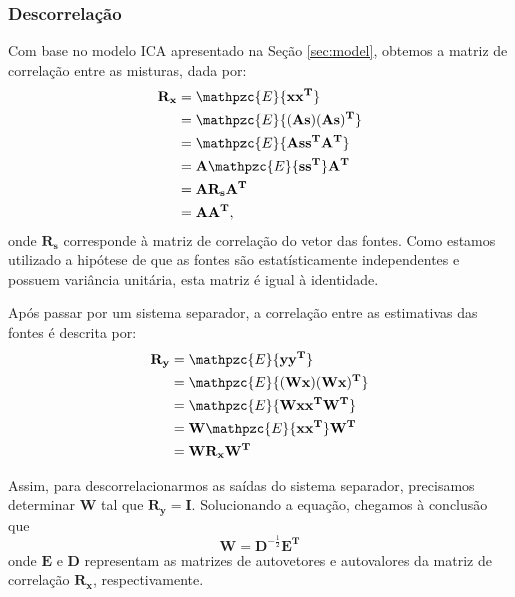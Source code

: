    \subsubsection{Descorrelação}
    Com base no modelo ICA apresentado na Seção \ref{sec:model}, obtemos a matriz de correlação entre as misturas, dada por:
    \begin{equation}
        \label{eq:correlationmatrixforx}
        \begin{split}
        \mathbf{R_x} & = \mathpzc{E}\{\mathbf{xx^T}\}\\
                     & = \mathpzc{E}\{\mathbf{(As)(As)^T}\}\\
                     & = \mathpzc{E}\{\mathbf{Ass^TA^T}\} \\
                     & = \mathbf{A}\mathpzc{E}\{\mathbf{ss^T}\}\mathbf{A^T} \\
                     & = \mathbf{A}\mathbf{R_s}\mathbf{A^T} \\
                     & = \mathbf{A}\mathbf{A^T}, \\
        \end{split}
    \end{equation}
    onde $\mathbf{R_s}$ corresponde à matriz de correlação do vetor das fontes. Como estamos utilizado a hipótese de que as fontes são estatísticamente independentes e possuem variância unitária, esta matriz é igual à identidade.
    
    Após passar por um sistema separador, a correlação entre as estimativas das fontes é descrita por:
    \begin{equation}
        \label{eq:correlationmatrixfory}
        \begin{split}
        \mathbf{R_y} & = \mathpzc{E}\{\mathbf{yy^T}\}\\
                     & = \mathpzc{E}\{\mathbf{(Wx)(Wx)^T}\}\\
                     & = \mathpzc{E}\{\mathbf{Wxx^TW^T}\} \\
                     & = \mathbf{W}\mathpzc{E}\{\mathbf{xx^T}\}\mathbf{W^T} \\
                     & = \mathbf{W}\mathbf{R_x}\mathbf{W^T}\\
        \end{split}
    \end{equation}
    
    Assim, para descorrelacionarmos as saídas do sistema separador, precisamos determinar $\mathbf{W}$ tal que $\mathbf{R_y = I}$. Solucionando a equação, chegamos à conclusão que
    \begin{equation}
        \label{eq:separationmatrixsolution}
        \mathbf{W} = \mathbf{D}^{-\frac{1}{2}}\mathbf{E^T}
    \end{equation}
    onde $\mathbf{E}$ e $\mathbf{D}$ representam as matrizes de autovetores e autovalores da matriz de correlação $\mathbf{R_x}$, respectivamente.
    
